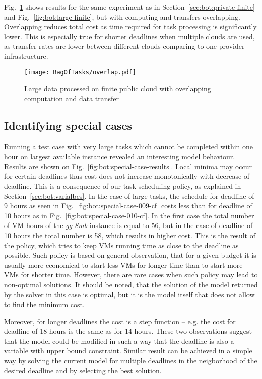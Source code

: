 {  Fig.~\ref{fig:bot:large-finite-overlap} shows results for the same experiment as in Section~\ref{sec:bot:private-finite} and Fig.~\ref{fig:bot:large-finite}, but with computing and transfers overlapping. Overlapping reduces total cost as time required for task processing is significantly lower.  This is especially true for shorter deadlines when multiple clouds are used, as transfer rates are lower between different clouds comparing to one provider infrastructure.
  
  \begin{figure}[tb]
     \centering
     \texttt{[image: BagOfTasks/overlap.pdf]}
     \caption{Large data processed on finite public cloud with overlapping computation and data transfer\label{fig:bot:large-finite-overlap}}
  \end{figure}  

\subsection{Identifying special cases}
\label{sec:bot:special}
  
  Running a test case with very large tasks which cannot be completed within one hour on largest available instance revealed an interesting model behaviour. Results are shown on Fig.~\ref{fig:bot:special-case-results}. Local minima may occur for certain deadlines thus cost does not increase monotonically with decrease of deadline. This is a consequence of our task scheduling policy, as explained in Section~\ref{sec:bot:varialbes}. In the case of large tasks, the schedule for deadline of 9 hours  as seen in Fig.~\ref{fig:bot:special-case-009-cf} costs less than for deadline of 10 hours as in Fig.~\ref{fig:bot:special-case-010-cf}. In the first case the total number of VM-hours of the \emph{gg-8mb} instance is equal to 56, but in the case of deadline of 10 hours the total number is 58, which results in higher cost. This is the result of the policy, which tries to keep VMs running time as close to the deadline as possible. Such policy is based on general observation, that for a given budget it is usually more economical to start less VMs for longer time than to start more VMs for shorter time. However, there are rare cases when such policy may lead to non-optimal solutions. It should be noted, that the solution of the model returned by the solver in this case is optimal, but it is the model itself that does not allow to find the minimum cost.
  
  Moreover, for longer deadlines the cost is a step function -- e.g. the cost for deadline of 18 hours is the same as for 14 hours. These two observations suggest that the model could be modified in such a way that the deadline is also a variable with upper bound constraint. Similar result can be achieved in a simple way by solving the current model for multiple deadlines in the neigborhood of the desired deadline and by selecting the best solution.  
  
}
